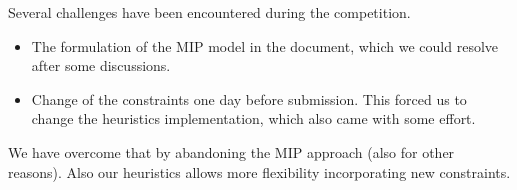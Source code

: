 \documentclass[a4paper]{article}
\begin{document}
Several challenges have been encountered during the competition. 
\begin{itemize}
    \item The formulation of the MIP model in the document, which we could resolve after some discussions.
    \item Change of the constraints one day before submission. This forced us to change the heuristics implementation, which also came with some effort.
\end{itemize}
We have overcome that by abandoning the MIP approach (also for other reasons).
Also our heuristics allows more flexibility incorporating new constraints.
\end{document}
